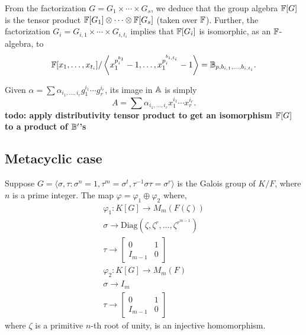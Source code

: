 From the factorization $G = G_1 \times \cdots \times G_s$, we deduce
that the group algebra $\mathbb{F}[G]$ is the tensor product $\mathbb{F}[G_1]
\otimes \cdots \otimes \mathbb{F}[G_s]$ (taken over $\mathbb{F}$). Further, the 
factorization $G_i = G_{i,1} \times \cdots \times G_{i,t_i}$
implies that $\mathbb{F}[G_i]$ is isomorphic, as an $\mathbb{F}$-algebra, to
$$\mathbb{F}[x_{1},\dots,x_{t_i}]/\left \langle x_{1}^{p_i^{b_{1}}}-1,\dots,x_{1}^{p_i^{b_{i,t_i}}}-1\right\rangle
=\mathbb{B}_{p,b_{i,1},\dots,b_{i,t_i}}.$$


Given $\alpha = \sum \alpha_{i_1,\dots,i_r} g_1^{i_1}\cdots
g_r^{i_r}$, its image in $\mathbb{A}$ is simply 
$$A= \sum
\alpha_{i_1,\dots,i_r} x_1^{i_1}\cdots x_r^{i_r}.$$
{\bf todo: apply distributivity tensor product to get an isomorphism
$\mathbb{F}[G]$ to a product of $\mathbb{B}'$'s}





\subsection{Metacyclic case}


\begin{lemma}\label{lem:metinjection}
Suppose $G = \langle \sigma , \tau : \sigma^n = 1, \tau^m = \sigma^t, \tau^{-1} \sigma \tau = \sigma^r \rangle$ is the Galois group 
of $K/F$, where $n$ is a prime integer. The map $\varphi = \varphi_1 \oplus \varphi_2$ where,
\begin{equation}
\begin{split}
\varphi_1: K[G] \longrightarrow M_{m}(F(\zeta))\\
\sigma \longrightarrow \mathrm{Diag}(\zeta, \zeta^r, \ldots , \zeta^{r^{m-1}})\\
\tau \longrightarrow 
\left[ \begin{array}{l|l}
0 & 1\\
\hline
I_{m-1}& 0
\end{array} \right] \\
\varphi_2: K[G] \longrightarrow M_m(F) \\
\sigma \longrightarrow I_m \\
\tau \longrightarrow 
\left[ \begin{array}{l|l}
0 & 1\\
\hline
I_{m-1}& 0
\end{array} \right] 
\end{split}
\end{equation}
where $\zeta$ is a primitive $n$-th root of unity, is an injective homomorphism.
\end{lemma}

